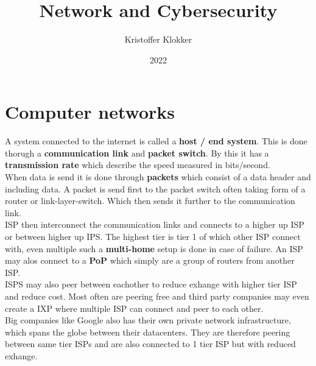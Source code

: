 \documentclass[12pt, a4paper]{article}
\title{Network and Cybersecurity}
\date{2022}
\author{Kristoffer Klokker}
\begin{document}
	\maketitle
	\clearpage
	\tableofcontents
	\clearpage
	\section{Computer networks}
		A system connected to the internet is called a \textbf{host / end system}. This is done thorugh a \textbf{communication link} and \textbf{packet switch}. By this it has a \textbf{transmission rate} which describe the speed measured in bits/second.\\
		When data is send it is done through \textbf{packets} which consist of a data header and including data. A packet is send first to the packet switch often taking form of a router or link-layer-switch. Which then sends it further to the communication link.\\
		ISP then interconnect the communication links and connects to a higher up ISP or between higher up IPS. The highest tier is tier 1 of which other ISP connect with, even multiple such a \textbf{multi-home} setup is done in case of failure. An ISP may alos connect to a \textbf{PoP} which simply are a group of routers from another ISP.\\
		ISPS may also peer between eachother to reduce exhange with higher tier ISP and reduce cost. Most often are peering free and third party companies may even create a IXP where multiple ISP can connect and peer to each other.\\
		Big companies like Google also has their own private network infrastructure, which spans the globe between their datacenters. They are therefore peering between same tier ISPs and are also connected to 1 tier ISP but with reduced exhange.
\end{document}
